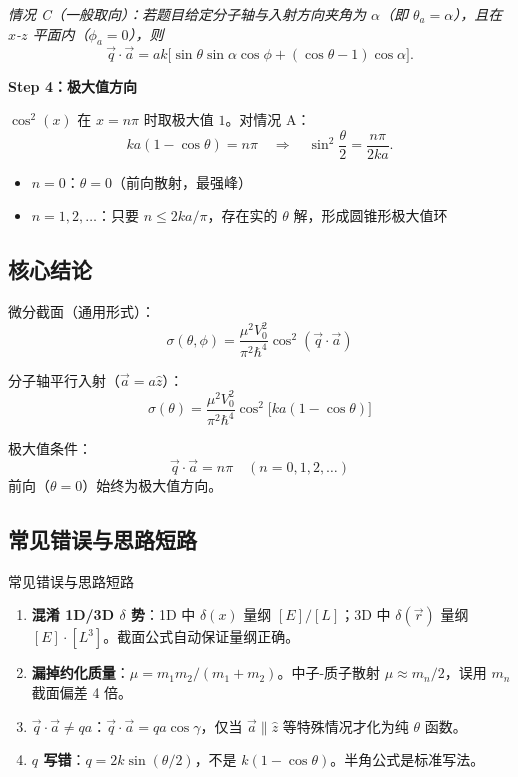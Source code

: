 \begin{derivationbox}[标准解题过程]
\textit{情况 C（一般取向）：若题目给定分子轴与入射方向夹角为 $\alpha$（即 $\theta_a = \alpha$），且在 $x$-$z$ 平面内（$\phi_a = 0$），则}
\[
\vec{q}\cdot\vec{a} = ak\bigl[\sin\theta\sin\alpha\cos\phi + (\cos\theta-1)\cos\alpha\bigr].
\]

\textbf{Step 4：极大值方向}

$\cos^2(x)$ 在 $x = n\pi$ 时取极大值 $1$。对情况 A：
\[
ka(1-\cos\theta) = n\pi \quad\Longrightarrow\quad \sin^2\frac{\theta}{2} = \frac{n\pi}{2ka}.
\]
\begin{itemize}
    \item $n = 0$：$\theta = 0$（前向散射，最强峰）
    \item $n = 1, 2, \dots$：只要 $n \leq 2ka/\pi$，存在实的 $\theta$ 解，形成圆锥形极大值环
\end{itemize}
\end{derivationbox}

\subsection{核心结论}

\begin{formulabox}[核心结论]
微分截面（通用形式）：
\[
\sigma(\theta,\phi) = \frac{\mu^2 V_0^2}{\pi^2\hbar^4}\cos^2(\vec{q}\cdot\vec{a})
\]

分子轴平行入射（$\vec{a} = a\hat{z}$）：
\[
\sigma(\theta) = \frac{\mu^2 V_0^2}{\pi^2\hbar^4}\cos^2\bigl[ka(1-\cos\theta)\bigr]
\]

极大值条件：
\[
\vec{q}\cdot\vec{a} = n\pi \quad (n = 0, 1, 2, \dots)
\]
前向（$\theta = 0$）始终为极大值方向。
\end{formulabox}

\subsection{常见错误与思路短路}

\begin{errorbox}[colback=white]{常见错误与思路短路}
\begin{enumerate}
    \item \textbf{混淆 1D/3D $\delta$ 势}：1D 中 $\delta(x)$ 量纲 $[E]/[L]$；3D 中 $\delta(\vec{r})$ 量纲 $[E]\cdot[L^3]$。截面公式自动保证量纲正确。
    \item \textbf{漏掉约化质量}：$\mu = m_1m_2/(m_1+m_2)$。中子-质子散射 $\mu \approx m_n/2$，误用 $m_n$ 截面偏差 4 倍。
    \item $\vec{q}\cdot\vec{a} \neq qa$：$\vec{q}\cdot\vec{a} = qa\cos\gamma$，仅当 $\vec{a} \parallel \hat{z}$ 等特殊情况才化为纯 $\theta$ 函数。
    \item \textbf{$q$ 写错}：$q = 2k\sin(\theta/2)$，不是 $k(1-\cos\theta)$。半角公式是标准写法。
\end{enumerate}
\end{errorbox}

